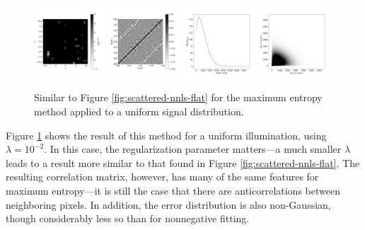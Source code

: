 \documentclass[twocolumn,tighten]{aastex61}
\begin{document}
\begin{figure}[t!]
\centering
\includegraphics[width=0.24\textwidth, angle=0]
                {figures/scattered-mem-flat.png}
\includegraphics[width=0.24\textwidth, angle=0]
                {figures/scattered-mem-flat-covar.png}
\includegraphics[width=0.24\textwidth, angle=0]
                {figures/scattered-mem-flat-dist.png}
\includegraphics[width=0.24\textwidth, angle=0]
                {figures/scattered-mem-flat-dist-joint.png}
\caption{ \label{fig:scattered-mem-flat} Similar to Figure
  \ref{fig:scattered-nnls-flat} for the maximum entropy method
  applied to a uniform signal distribution.}
\end{figure} 

Figure \ref{fig:scattered-mem-flat} shows the result of this method
for a uniform illumination, using $\lambda=10^{-2}$. In this case, the
regularization parameter matters---a much smaller $\lambda$ leads to
a result more similar to that found in Figure
\ref{fig:scattered-nnls-flat}. The resulting correlation matrix,
however, has many of the same features for maximum entropy---it is
still the case that there are anticorrelations between neighboring
pixels. In addition, the error distribution is also non-Gaussian,
though considerably less so than for nonnegative fitting.
\end{document}
